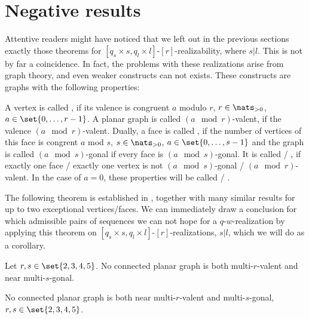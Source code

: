 \section{Negative results}\label{sec:negative:results}

Attentive readers might have noticed that we left out in the previous sections exactly those theorems for $[q_s \times s, q_l \times l]$-$[r]$-realizability, where $s | l$. This is not by far a coincidence. In fact, the problems with these realizations arise from graph theory, and even weaker constructs can not exists. These constructs are graphs with the following properties: 

\begin{definition} A vertex is called , if its valence is congruent $a$ modulo $r$, $r \in \nats_{>0}$, $a \in \set{0, \dots, r - 1}$. A planar graph is called $(a \mod r)$-valent, if the valence $(a \mod r)$-valent. Dually, a face is called , if the number of vertices of this face is congrent $a$ mod $s$, $s \in \nats_{>0}$, $a \in \set{0, \dots, s - 1}$ and the graph is called $(a \mod s)$-gonal if every face is $(a \mod s)$-gonal. It is called  / , if exactly one face / exactly one vertex is not $(a \mod s)$-gonal / $(a \mod r)$-valent. In the case of $a = 0$, these properties will be called  / .
\end{definition}

The following theorem is established in \cite{malkevitch1970properties}, together with many similar results for up to two exceptional vertices/faces. We can immediately draw a conclusion for which admissible pairs of sequences we can not hope for a $q$-$w$-realization by applying this theorem on $[q_s \times s, q_l \times l]$-$[r]$-realizations, $s | l$, which we will do as a corollary.

\begin{theorem}\label{thm:near:regular:nonrealizable} Let $r, s \in \set{2, 3, 4, 5}$. No connected planar graph is both multi-$r$-valent and near multi-$s$-gonal.
\end{theorem}
\begin{corollary} No connected planar graph is both near multi-$r$-valent and multi-$s$-gonal, $r, s \in \set{2, 3, 4, 5}$.
\end{corollary}

